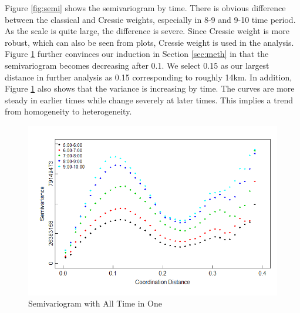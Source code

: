 \documentclass[hidelinks,12pt]{article}
\begin{document}
	Figure \ref{fig:semi} shows the semivariogram by time. There is obvious difference between the classical and Cressie weights, especially in 8-9 and 9-10 time period. As the scale is quite large, the difference is severe. Since Cressie weight is more robust, which can also be seen from plots, Cressie weight is used in the analysis.\\
	
	Figure \ref{fig:semi_one} further convinces our induction in Section \ref{sec:meth} in that the semivariogram becomes decreasing after 0.1. We select 0.15 as our largest distance in further analysis as 0.15 corresponding to roughly 14km. In addition, Figure \ref{fig:semi_one} also shows that the variance is increasing by time. The curves are more steady in earlier times while change severely at later times. This implies a trend from homogeneity to heterogeneity.
	\begin{figure}[!ht]
		\includegraphics[width=\textwidth]{semi_full.png}
		\caption{Semivariogram with All Time in One \label{fig:semi_one}}
	\end{figure}
\FloatBarrier
	
	
\end{document}

